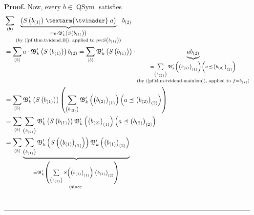\documentclass[numbers=enddot,12pt,final,onecolumn,notitlepage,abstracton]{scrartcl}%
\theoremstyle{definition}
\newenvironment{proof}[1][Proof]{\noindent\textbf{#1.} }{\ \rule{0.5em}{0.5em}}
\newenvironment{verlong}{}{}
\newcommand{\tvi}{\left. \textarm{\tvimadur} \right.}
\let\sumnonlimits\sum
\renewcommand{\sum}{\sumnonlimits\limits}
\begin{document}
\begin{verlong}
\begin{proof}
Now, every $b\in\operatorname*{QSym}$ satisfies%
\begin{align*}
&  \sum_{\left(  b\right)  }\underbrace{\left(  S\left(  b_{\left(  1\right)
}\right)  \tvi a\right)  }_{\substack{=a\cdot\mathfrak{B}_{k}^{\prime}\left(
S\left(  b_{\left(  1\right)  }\right)  \right)  \\\text{(by
(\ref{pf.thm.tvidend.B}), applied to }p=S\left(  b_{\left(  1\right)
}\right)  \text{)}}}b_{\left(  2\right)  }\\
&  =\sum_{\left(  b\right)  }a\cdot\mathfrak{B}_{k}^{\prime}\left(  S\left(
b_{\left(  1\right)  }\right)  \right)  b_{\left(  2\right)  }=\sum_{\left(
b\right)  }\mathfrak{B}_{k}^{\prime}\left(  S\left(  b_{\left(  1\right)
}\right)  \right)  \cdot\underbrace{ab_{\left(  2\right)  }}_{\substack{=\sum
_{\left(  b_{\left(  2\right)  }\right)  }\mathfrak{B}_{k}^{\prime}\left(
\left(  b_{\left(  2\right)  }\right)  _{\left(  1\right)  }\right)  \left(
a\left.  \preceq\right.  \left(  b_{\left(  2\right)  }\right)  _{\left(
2\right)  }\right)  \\\text{(by (\ref{pf.thm.tvidend.mainlem}), applied to
}f=b_{\left(  2\right)  }\text{)}}}\\
&  =\sum_{\left(  b\right)  }\mathfrak{B}_{k}^{\prime}\left(  S\left(
b_{\left(  1\right)  }\right)  \right)  \left(  \sum_{\left(  b_{\left(
2\right)  }\right)  }\mathfrak{B}_{k}^{\prime}\left(  \left(  b_{\left(
2\right)  }\right)  _{\left(  1\right)  }\right)  \left(  a\left.
\preceq\right.  \left(  b_{\left(  2\right)  }\right)  _{\left(  2\right)
}\right)  \right) \\
&  =\sum_{\left(  b\right)  }\sum_{\left(  b_{\left(  2\right)  }\right)
}\mathfrak{B}_{k}^{\prime}\left(  S\left(  b_{\left(  1\right)  }\right)
\right)  \mathfrak{B}_{k}^{\prime}\left(  \left(  b_{\left(  2\right)
}\right)  _{\left(  1\right)  }\right)  \left(  a\left.  \preceq\right.
\left(  b_{\left(  2\right)  }\right)  _{\left(  2\right)  }\right) \\
&  =\sum_{\left(  b\right)  }\underbrace{\sum_{\left(  b_{\left(  1\right)
}\right)  }\mathfrak{B}_{k}^{\prime}\left(  S\left(  \left(  b_{\left(
1\right)  }\right)  _{\left(  1\right)  }\right)  \right)  \mathfrak{B}%
_{k}^{\prime}\left(  \left(  b_{\left(  1\right)  }\right)  _{\left(
2\right)  }\right)  }_{\substack{=\mathfrak{B}_{k}^{\prime}\left(
\sum_{\left(  b_{\left(  1\right)  }\right)  }S\left(  \left(  b_{\left(
1\right)  }\right)  _{\left(  1\right)  }\right)  \cdot\left(  b_{\left(
1\right)  }\right)  _{\left(  2\right)  }\right)  \\\text{(since }%
}}
\end{align*}
\end{proof}
\end{verlong}
\end{document}
